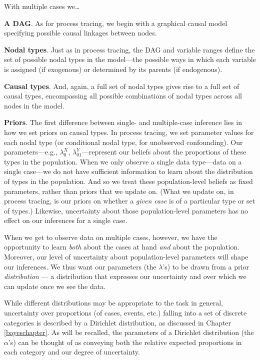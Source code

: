 \documentclass[
  12pt,
]{book}
\begin{document}
With multiple cases we\ldots{}

\textbf{A DAG}. As for process tracing, we begin with a graphical causal model specifying possible causal linkages between nodes.

\textbf{Nodal types}. Just as in process tracing, the DAG and variable ranges define the set of possible nodal types in the model---the possible ways in which each variable is assigned (if exogenous) or determined by its parents (if endogenous).

\textbf{Causal types}. And, again, a full set of nodal types gives rise to a full set of causal types, encompassing all possible combinations of nodal types across all nodes in the model.

\textbf{Priors}. The first difference between single- and multiple-case inference lies in how we set priors on causal types. In process tracing, we set parameter values for each nodal type (or conditional nodal type, for unobserved confounding). Our parameters---e.g., \(\lambda^X_0\), \(\lambda^Y_{01}\)---represent our beliefs about the proportions of these types in the population. When we only observe a single data type---data on a single case---we do not have sufficient information to learn about the distribution of types in the population. And so we treat these population-level beliefs as fixed parameters, rather than priors that we update on. (What we update on, in process tracing, is our priors on whether a \emph{given case} is of a particular type or set of types.) Likewise, uncertainty about those population-level parameters has no effect on our inferences for a single case.

When we get to observe data on multiple cases, however, we have the opportunity to learn \emph{both} about the cases at hand \emph{and} about the population. Moreover, our level of uncertainty about population-level parameters will shape our inferences. We thus want our parameters (the \(\lambda\)'s) to be drawn from a prior \emph{distribution} --- a distribution that expresses our uncertainty and over which we can update once we see the data.

While different distributions may be appropriate to the task in general, uncertainty over proportions (of cases, events, etc.) falling into a set of discrete categories is described by a Dirichlet distribution, as discussed in Chapter \ref{bayeschapter}. As will be recalled, the parameters of a Dirichlet distribution (the \(\alpha\)'s) can be thought of as conveying both the relative expected proportions in each category and our degree of uncertainty.
\end{document}
